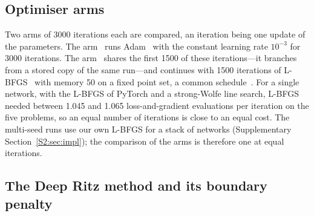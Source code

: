 \subsection{Optimiser arms}\label{s3_methods:sec:optim}

Two arms of 3000 iterations each are compared, an iteration being one update of the
parameters. The arm \Adam\ runs Adam~\citep{kingma2015} with the constant learning rate
$10^{-3}$ for 3000 iterations. The arm \AdamLBFGS\ shares the first 1500 of these
iterations---it branches from a stored copy of the same run---and continues with 1500
iterations of L-BFGS~\citep{liu1989} with memory 50 on a fixed point set, a common
schedule~\citep{lu2021}.
For a single network, with the L-BFGS of PyTorch and a strong-Wolfe line search, L-BFGS needed
between 1.045 and 1.065 loss-and-gradient evaluations per iteration on the five problems, so
an equal number of iterations is close to an equal cost. The multi-seed runs use our own
L-BFGS for a stack of networks (Supplementary Section~\ref{S2:sec:impl}); the comparison of the
arms is therefore one at equal iterations.

\subsection{The Deep Ritz method and its boundary penalty}\label{s3_methods:sec:ritz}

